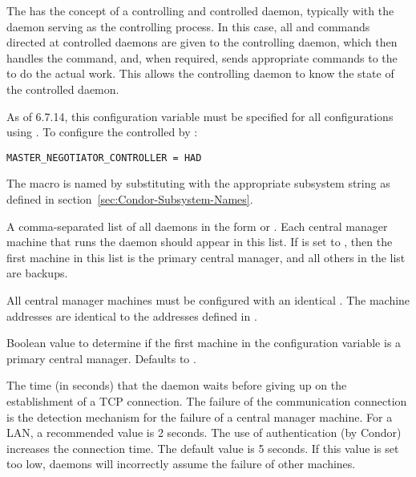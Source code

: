 \begin{description}
  The  has the concept of a controlling and controlled
  daemon, typically
  with the  daemon serving as the controlling process.
  In this case, all  and  commands directed
  at controlled daemons are given to the controlling daemon, which
  then handles the command, and, when required, sends appropriate
  commands to the  to do the actual work.  This allows
  the controlling daemon to know the state of the controlled daemon.

  As of 6.7.14, this configuration variable must be specified for all
  configurations using .
  To configure the  controlled by :

\begin{verbatim}
MASTER_NEGOTIATOR_CONTROLLER = HAD
\end{verbatim}

  The macro is named by substituting 
  with the appropriate subsystem string as defined in
  section~\ref{sec:Condor-Subsystem-Names}.


\item[\Macro{HAD\_LIST}]
  \label{param:HADList}
  A comma-separated list of all  daemons
  in the form  or .
  Each central manager machine that runs the  daemon
  should appear in this list.
  If  is set to ,
  then the first machine in this list is the primary central
  manager, and all others in the list are backups.

  All central manager machines must be configured with 
  an identical .
  The machine addresses are identical to the addresses defined
  in .

%
%
%
%

\item[\Macro{HAD\_USE\_PRIMARY}]
  \label{param:HADUsePrimary}
  Boolean value to determine if the first machine in the 
   configuration variable is
  a primary central manager.
  Defaults to .


\item[\Macro{HAD\_CONNECTION\_TIMEOUT}]
  \label{param:HADConnectionTimeout}
  The time (in seconds) that the  daemon waits before giving
  up on the establishment of a TCP connection.
  The failure of the communication connection
  is the detection mechanism for the failure of a central
  manager machine.
  For a LAN, a recommended value is 2 seconds.
  The use of authentication (by Condor) increases the connection
  time.
  The default value is 5 seconds.
  If this value is set too low,
   daemons will incorrectly assume
  the failure of other machines.


\end{description}
